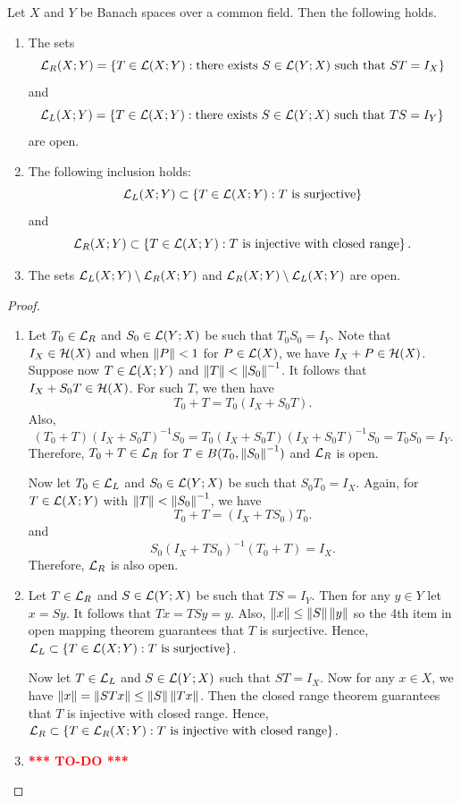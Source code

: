 \documentclass[a4paper]{article}
\newcommand{\TODO}{\textcolor{red}{\textbf{*** TO-DO ***}}}
\begin{document}
\begin{thm}
Let $X$ and $Y$ be Banach spaces over a common field. Then the following holds.
\begin{enumerate}
\item The sets
\[
\mathcal{L}_R(X; Y) = \left\{ T \in \mathcal{L}(X; Y) : \text{there exists $S \in \mathcal{L}(Y; X)$ such that $ST = I_X$} \right\}
\]
and
\[
\mathcal{L}_L(X; Y) = \left\{ T \in \mathcal{L}(X; Y) : \text{there exists $S \in \mathcal{L}(Y; X)$ such that $TS = I_Y$} \right\}
\]
are open.
\item The following inclusion holds:
\[
\mathcal{L}_L(X; Y) \subset \left\{ T \in \mathcal{L}(X; Y) : \text{$T$ is surjective} \right\}
\]
and
\[
\mathcal{L}_R(X; Y) \subset \left\{ T \in \mathcal{L}(X; Y) : \text{$T$ is injective with closed range} \right\}.
\]
\item The sets $\mathcal{L}_L(X; Y) \setminus \mathcal{L}_R(X; Y)$ and $\mathcal{L}_R(X; Y) \setminus \mathcal{L}_L(X; Y)$ are open.
\end{enumerate}
\end{thm}

\begin{proof}
\begin{enumerate}
\item Let $T_0 \in \mathcal{L}_R$ and $S_0 \in \mathcal{L}(Y; X)$ be such that
$T_0 S_0 = I_Y$. Note that $I_X \in \mathcal{H}(X)$ and when $\left\lVert P\right\rVert < 1$
for $P \in \mathcal{L}(X)$, we have $I_X + P \in \mathcal{H}(X)$. Suppose now
$T \in \mathcal{L}(X; Y)$ and $\left\lVert T\right\rVert < \left\lVert S_0\right\rVert^{-1}$. It follows that
$I_X + S_0 T \in \mathcal{H}(X)$. For such $T$, we then have
\[
T_0 + T = T_0 (I_X + S_0 T).
\]
Also,
\[
(T_0 + T) (I_X + S_0 T)^{-1} S_0 = T_0 (I_X + S_0 T) (I_X + S_0 T)^{-1} S_0
= T_0 S_0 = I_Y.
\]
Therefore, $T_0 + T \in \mathcal{L}_R$ for $T \in B(T_0, \left\lVert S_0\right\rVert^{-1})$
and $\mathcal{L}_R$ is open.

Now let $T_0 \in \mathcal{L}_L$ and $S_0 \in \mathcal{L}(Y; X)$ be such that
$S_0 T_0 = I_X$. Again, for $T \in \mathcal{L}(X; Y)$ with
$\left\lVert T\right\rVert < \left\lVert S_0\right\rVert^{-1}$, we have
\[
T_0 + T = (I_X + T S_0) T_0.
\]
and
\[
S_0 (I_X + T S_0)^{-1} (T_0 + T) = I_X.
\]
Therefore, $\mathcal{L}_R$ is also open.

\item Let $T \in \mathcal{L}_R$ and $S \in \mathcal{L}(Y; X)$ be such that
$TS = I_Y$. Then for any $y \in Y$ let $x = Sy$. It follows
that $Tx = TSy = y$. Also, $\left\lVert x\right\rVert \leq \left\lVert S\right\rVert \left\lVert y\right\rVert$
so the 4th item in open mapping theorem guarantees that $T$ is
surjective. Hence, $\mathcal{L}_L \subset \left\{ T \in \mathcal{L}(X; Y) :
\text{$T$ is surjective}\right\}$.

Now let $T \in \mathcal{L}_L$ and $S \in \mathcal{L}(Y; X)$ such that
$ST = I_X$. Now for any $x \in X$, we have $\left\lVert x\right\rVert
= \left\lVert STx\right\rVert \leq \left\lVert S\right\rVert \left\lVert Tx\right\rVert$. Then the closed
range theorem guarantees that $T$ is injective with closed
range. Hence, $\mathcal{L}_R \subset \left\{ T \in \mathcal{L}_R(X; Y) :
\text{$T$ is injective with closed range} \right\}$.

\item \TODO
\end{enumerate}

\end{proof}
\end{document}
